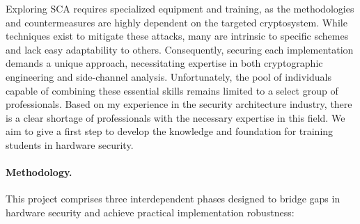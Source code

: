 \documentclass[11pt, a4paper]{article}
\begin{document}
Exploring SCA requires specialized equipment and training, as the 
methodologies and countermeasures are highly dependent on the 
targeted cryptosystem. While techniques exist to mitigate these 
attacks, many are intrinsic to specific schemes and lack easy 
adaptability to others. Consequently, securing each implementation 
demands a unique approach, necessitating expertise in both 
cryptographic engineering and side-channel analysis. Unfortunately, 
the pool of individuals capable of combining these essential skills 
remains limited to a select group of professionals. Based on my experience in the 
security architecture industry, there is a 
clear shortage of professionals with the necessary expertise in this 
field. We aim to give a first step to develop the knowledge
and foundation for training students in hardware security.
\vspace{-0.5cm}


\paragraph{Methodology.} This project comprises three 
interdependent phases designed to bridge gaps 
in hardware security and achieve practical implementation robustness:
\end{document}
